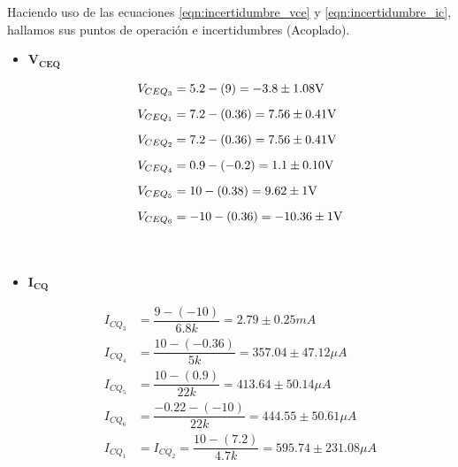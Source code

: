 \begin{enumerate}
        Haciendo uso de las ecuaciones \ref{eqn:incertidumbre_vce} y \ref{eqn:incertidumbre_ic}, hallamos sus puntos de operación e incertidumbres (Acoplado).

        \begin{itemize}
          \item $\mathbf{V_{CEQ}}$

                \begin{align*}
                  V_{CEQ_3} & =5.2-(9)=-3.8 \pm 1.08\volt    \\[0.2cm]
                  V_{CEQ_1} & =7.2-(0.36)=7.56 \pm 0.41\volt \\[0.2cm]
                  V_{CEQ_2} & =7.2-(0.36)=7.56 \pm 0.41\volt \\[0.2cm]
                  V_{CEQ_4} & =0.9-(-0.2)=1.1 \pm 0.10\volt  \\[0.2cm]
                  V_{CEQ_5} & =10-(0.38)=9.62 \pm 1\volt     \\[0.2cm]
                  V_{CEQ_6} & =-10-(0.36)=-10.36 \pm 1\volt  \\[1cm]
                \end{align*}


          \item $\mathbf{I_{CQ}}$

                \begin{align*}
                  I_{CQ_3} & =\dfrac{9-(-10)}{6.8k}=2.79 \pm 0.25 mA                   \\[0.2cm]
                  I_{CQ_4} & =\dfrac{10-(-0.36)}{5k}=357.04 \pm 47.12\mu A             \\[0.2cm]
                  I_{CQ_5} & =\dfrac{10-(0.9)}{22k}=413.64 \pm 50.14\mu A              \\[0.2cm]
                  I_{CQ_6} & =\dfrac{-0.22-(-10)}{22k}=444.55 \pm 50.61\mu A           \\[0.2cm]
                  I_{CQ_1} & = I_{CQ_2}=\dfrac{10-(7.2)}{4.7k}=595.74 \pm 231.08 \mu A \\[1cm]
                \end{align*}




\end{itemize}
\end{enumerate}
